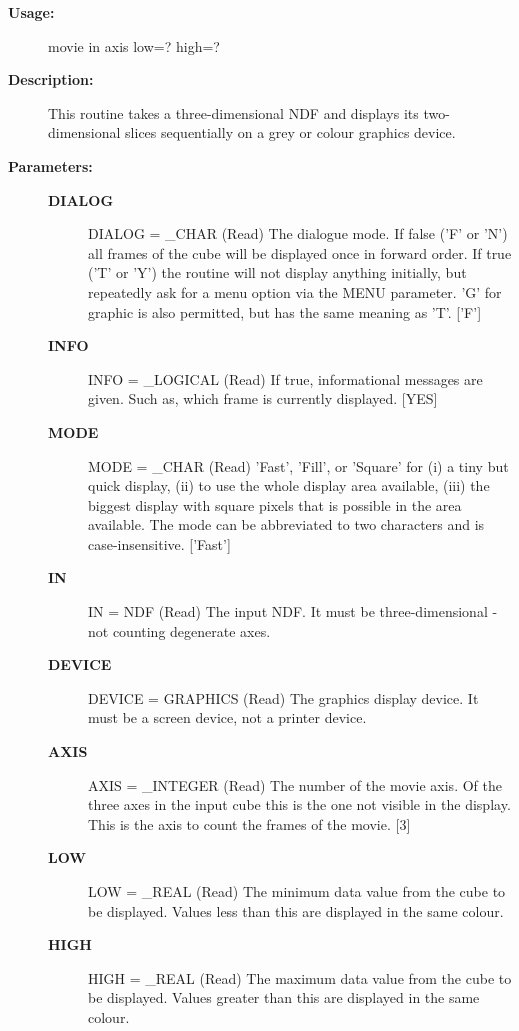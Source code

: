 \begin{description}

\item [{\bf Usage:}]

   movie in axis low=? high=?


\item [{\bf Description:}]

   This routine takes a three-dimensional NDF and displays its
   two-dimensional slices sequentially on a grey or colour graphics
   device.


\item [{\bf Parameters:}]
\begin{description}
\item [{\bf DIALOG}]
DIALOG = _CHAR (Read)
   The dialogue mode. If false ('F' or 'N') all frames of the cube
   will be displayed once in forward order. If true ('T' or 'Y')
   the routine will not display anything initially, but repeatedly
   ask for a menu option via the MENU parameter. 'G' for graphic
   is also permitted, but has the same meaning as 'T'. ['F']
\item [{\bf INFO}]
INFO = _LOGICAL (Read)
   If true, informational messages are given. Such as, which frame
   is currently displayed. [YES]
\item [{\bf MODE}]
MODE = _CHAR (Read)
   'Fast', 'Fill', or 'Square' for (i) a tiny but quick display,
   (ii) to use the whole display area available, (iii) the biggest
   display with square pixels that is possible in the area
   available. The mode can be abbreviated to two characters and is
   case-insensitive. ['Fast']
\item [{\bf IN}]
IN = NDF (Read)
   The input NDF. It must be three-dimensional - not counting
   degenerate axes.
\item [{\bf DEVICE}]
DEVICE = GRAPHICS (Read)
   The graphics display device. It must be a screen device, not a
   printer device.
\item [{\bf AXIS}]
AXIS = _INTEGER (Read)
   The number of the movie axis. Of the three axes in the input
   cube this is the one not visible in the display. This is the
   axis to count the frames of the movie. [3]
\item [{\bf LOW}]
LOW = _REAL (Read)
   The minimum data value from the cube to be displayed. Values
   less than this are displayed in the same colour.
\item [{\bf HIGH}]
HIGH = _REAL (Read)
   The maximum data value from the cube to be displayed. Values
   greater than this are displayed in the same colour.

\end{description}
\end{description}
